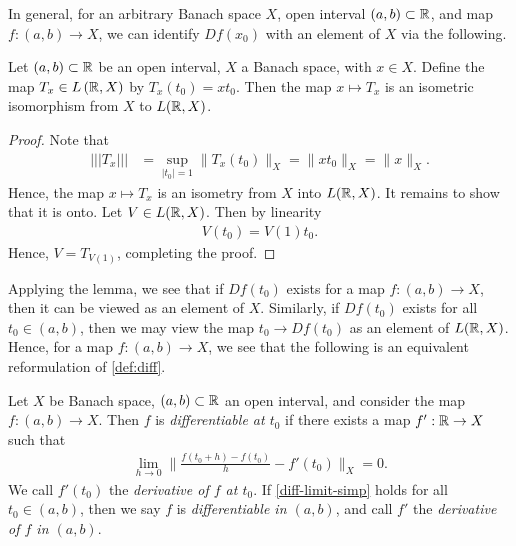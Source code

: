 %
%
In general, for an arbitrary Banach space $X$, open interval $(a,b) \subset
\mathbb{R}$, and map $f:(a,b) \to X$, we can identify $Df(x_0)$ with an
element of $X$ via the following.
%
%
%
%
%
%
%
%
\begin{lemma}
	\label{lem:isometry} Let $(a,b) \subset \mathbb{R}$ be an open interval, $X$ a Banach
	space, with $x \in X$. Define the map $T_x \in L\left ( \mathbb{R} , X \right )$ by
	$T_x(t_0) = x t_0$. Then the map $x \mapsto T_x$ is an
	isometric isomorphism from
	$X$ to $L(\mathbb{R} , X)$. 
\end{lemma}
%
%
\begin{proof} Note that 
%
%
\begin{equation*}
	\begin{split}
		| | | T_x | | |
		& = \sup_{|t_0| = 1} \| T_x (t_0) \|_X
		= \| x t_0\|_X
		= \|x\|_X.
	\end{split}
\end{equation*}
%
%
Hence, the map $x \mapsto T_x$ is an isometry from $X$ into $L(\mathbb{R},
X)$. It remains to show that it is onto. Let $V \in L( \mathbb{R}, X)$. Then
by linearity
%
%
\begin{equation*}
	\begin{split}
		V(t_0) = V(1)t_0. 
	\end{split}
\end{equation*}
%
%
Hence, $V = T_{V(1)}$, completing the proof. 
\end{proof}
%
%
Applying the lemma, we see that if $Df(t_0)$ exists for a map $f: (a,b) \to X$,
then it can be viewed as an
element of $X$. Similarly, if $Df(t_0)$ exists for all $t_0 \in (a,b)$, then
we may view the map $t_0 \to Df(t_0)$ as an
element of $L( \mathbb{R}, X)$. Hence, for a
map $f:(a,b) \to X$, we see that the following is an equivalent
reformulation of \autoref{def:diff}. 
\begin{definition}
	\label{def:diff-simp}
	Let $X$ be Banach space, $(a,b) \subset \mathbb{R}$ an open interval, and
	consider the map $f: (a,b) \to X$.
	Then $f$ is \emph{differentiable at $t_0$} if there exists a map
	$f': \mathbb{R} \to X$ such that 
	\begin{equation}
		\label{diff-limit-simp}
		\begin{split}
			\lim_{h \to 0} \| \frac{f(t_0+ h) - f(t_0) 
			 }{h} - f'(t_0) \|_X = 0.
		\end{split}
	\end{equation}
	We call $f'(t_0)$ the \emph{derivative of $f$ at $t_0$}.
	If \eqref{diff-limit-simp}
	holds for all $t_0 \in (a,b)$, then we say $f$ is \emph{differentiable in
	$(a,b)$}, and call $f'$ the
	\emph{derivative of $f$ in $(a,b)$}.  
\end{definition}
